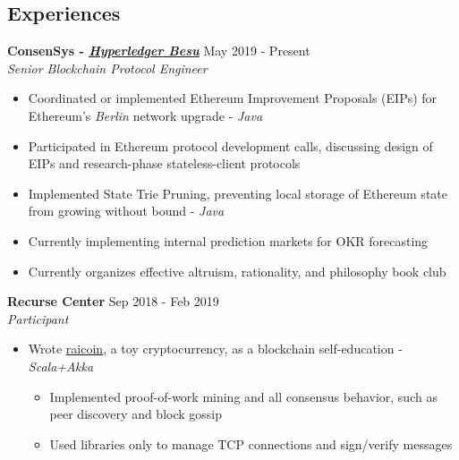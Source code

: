 \documentclass[overlapped]{res}
\begin{document}

\address{\href{rai.dev}{\underline{rai.dev}} \\ \href{https://www.github.com/ratanrsur}{\underline{github.com/ratanrsur}}}
\address{\href{mailto:ratan.r.sur@gmail.com}{\underline{ratan.r.sur@gmail.com}} \\ \hfill +1 646 410 6411\\\hfill{}US Citizen}
\begin{resume}


    \section{Experiences}

    {\bf ConsenSys - \href{https://www.github.com/Hyperledger/Besu}{\underline{\em Hyperledger Besu}}} \hfill May 2019 - Present \\
    {\em Senior Blockchain Protocol Engineer\/}
    \begin{itemize} \itemsep-2pt
        \item Coordinated or implemented Ethereum Improvement Proposals (EIPs) for Ethereum's {\em Berlin} network upgrade - {\em Java}
        \item
            Participated in Ethereum protocol development calls, discussing design of EIPs and research-phase stateless-client protocols
        \item
          Implemented State Trie Pruning, preventing local storage of Ethereum state from growing without bound - {\em Java}
        \item Currently implementing internal prediction markets for OKR forecasting
        \item Currently organizes effective altruism, rationality, and philosophy book club
    \end{itemize}

    {\bf Recurse Center} \hfill Sep 2018 - Feb 2019 \\
    {\em Participant\/}
    \begin{itemize} \itemsep-2pt
        \item
          Wrote \href{https://www.github.com/ratanrsur/raicoin}{\underline{raicoin}}, a toy cryptocurrency, as a blockchain self-education - {\em Scala+Akka}
        \begin{itemize} \itemsep-2pt
          \item
            Implemented proof-of-work mining and all consensus behavior, such as peer discovery and block gossip
          \item Used libraries only to manage TCP connections and sign/verify messages
        \end{itemize}


\end{itemize}
\end{resume}
\end{document}
